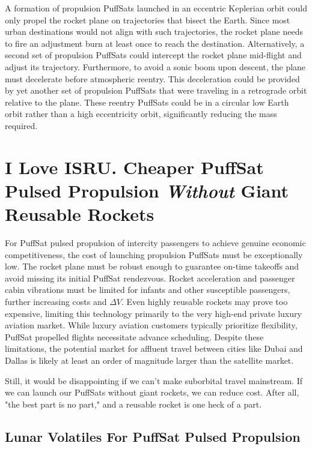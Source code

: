 \documentclass{article}
\begin{document}
{A formation of propulsion PuffSats launched in an eccentric Keplerian orbit could only propel the  rocket plane on trajectories that bisect the Earth. Since most urban destinations would not align with such trajectories, the rocket plane needs to fire an adjustment burn at least once to reach the destination. Alternatively, a second set of propulsion PuffSats could intercept the rocket plane mid-flight and adjust its trajectory. Furthermore, to avoid a sonic boom upon descent, the plane must decelerate before atmospheric reentry. This deceleration could be provided by yet another set of propulsion PuffSats that were traveling in a retrograde orbit relative to the plane. These reentry PuffSats could be in a circular low Earth orbit rather than a high eccentricity orbit, significantly reducing the mass required.

\section{I Love ISRU.  Cheaper PuffSat Pulsed Propulsion \textit{Without} Giant Reusable Rockets}
For PuffSat pulsed propulsion of intercity passengers to achieve genuine economic competitiveness, the cost of launching  propulsion PuffSats must be exceptionally low.  The rocket plane must be robust enough to guarantee on-time takeoffs and avoid missing its initial PuffSat rendezvous.  Rocket acceleration and passenger cabin vibrations must be limited for infants and other susceptible passengers, further increasing costs and $\Delta V$.  Even highly reusable rockets may prove too expensive, limiting this technology primarily to the very high-end private luxury aviation market. While luxury aviation customers typically prioritize flexibility, PuffSat propelled flights necessitate advance scheduling.  Despite these limitations, the potential market for affluent travel between cities like Dubai and Dallas is likely at least an order of magnitude larger than the satellite market.

Still, it would be disappointing if we can't make suborbital travel mainstream.   If we can launch our PuffSats without giant rockets, we can reduce cost.   After all, "the best part is no part," \cite{best_part_no_part} and a reusable rocket is one heck of a part.

\subsection{Lunar Volatiles For PuffSat Pulsed Propulsion}

}
\end{document}
